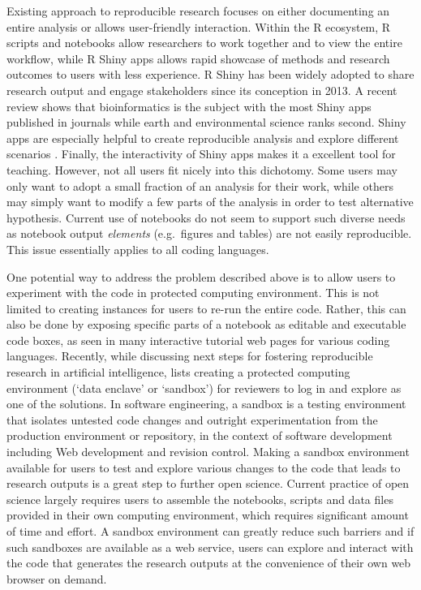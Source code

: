 Existing approach to reproducible research focuses on either documenting
an entire analysis or allows user-friendly interaction. Within the R
ecosystem, R scripts and notebooks allow researchers to work together
and to view the entire workflow, while R Shiny apps \citep{shiny}
allows rapid showcase of methods and research outcomes to users with
less experience. R Shiny has been widely adopted to share research
output and engage stakeholders since its conception in 2013. A recent
review \citep{Kasprzak} shows that bioinformatics is the subject with
the most Shiny apps published in journals while earth and environmental
science ranks second. Shiny apps are especially helpful to create
reproducible analysis \citep[e.g.~examples in][]{Hollaway2020} and
explore different scenarios \citep[e.g.][]{Whateley2015, Mose2018}.
Finally, the interactivity of Shiny apps makes it a excellent tool for
teaching\citep[e.g.][]{Williams2017, adventr}. However, not all users
fit nicely into this dichotomy. Some users may only want to adopt a
small fraction of an analysis for their work, while others may simply
want to modify a few parts of the analysis in order to test alternative
hypothesis. Current use of notebooks do not seem to support such diverse
needs as notebook output \textit{elements} (e.g.~figures and tables) are
not easily reproducible. This issue essentially applies to all coding
languages.

One potential way to address the problem described above is to allow
users to experiment with the code in protected computing environment.
This is not limited to creating instances for users to re-run the entire
code. Rather, this can also be done by exposing specific parts of a
notebook as editable and executable code boxes, as seen in many
interactive tutorial web pages for various coding languages. Recently,
while discussing next steps for fostering reproducible research in
artificial intelligence, \citet{Carter2019} lists creating a protected
computing environment (`data enclave' or `sandbox') for reviewers to log
in and explore as one of the solutions. In software engineering, a
sandbox is a testing environment that isolates untested code changes and
outright experimentation from the production environment or repository,
in the context of software development including Web development and
revision control. Making a sandbox environment available for users to
test and explore various changes to the code that leads to research
outputs is a great step to further open science. Current practice of
open science largely requires users to assemble the notebooks, scripts
and data files provided in their own computing environment, which
requires significant amount of time and effort. A sandbox environment
can greatly reduce such barriers and if such sandboxes are available as
a web service, users can explore and interact with the code that
generates the research outputs at the convenience of their own web browser
on demand.

